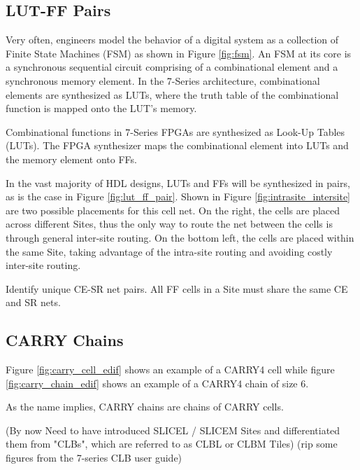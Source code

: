 \documentclass{article}
\begin{document}
\begin{multicols}{2}
        \subsection{LUT-FF Pairs}
            Very often, engineers model the behavior of a digital system as a collection of Finite State Machines (FSM) as shown in Figure \ref{fig:fsm}. 
            An FSM at its core is a synchronous sequential circuit comprising of a combinational element and a synchronous memory element. 
            In the 7-Series architecture, combinational elements are synthesized as LUTs, where the truth table of the combinational function is mapped onto the LUT's memory. 

            Combinational functions in 7-Series FPGAs are synthesized as Look-Up Tables (LUTs). 
            The FPGA synthesizer maps the combinational element into LUTs and the memory element onto FFs. 


            In the vast majority of HDL designs, LUTs and FFs will be synthesized in pairs, as is the case in Figure \ref{fig:lut_ff_pair}. 
            Shown in Figure \ref{fig:intrasite_intersite} are two possible placements for this cell net. 
            On the right, the cells are placed across different Sites, thus the only way to route the net between the cells is through general inter-site routing. 
            On the bottom left, the cells are placed within the same Site, taking advantage of the intra-site routing and avoiding costly inter-site routing. 

            Identify unique CE-SR net pairs. 
            All FF cells in a Site must share the same CE and SR nets. 


        \subsection{CARRY Chains}


            Figure \ref{fig:carry_cell_edif} shows an example of a CARRY4 cell while figure \ref{fig:carry_chain_edif} shows an example of a CARRY4 chain of size 6. 

            As the name implies, CARRY chains are chains of CARRY cells. 


            (By now Need to have introduced SLICEL / SLICEM Sites and differentiated them from "CLBs", which are referred to as CLBL or CLBM Tiles)
            (rip some figures from the 7-series CLB user guide)


\end{multicols}
\end{document}
